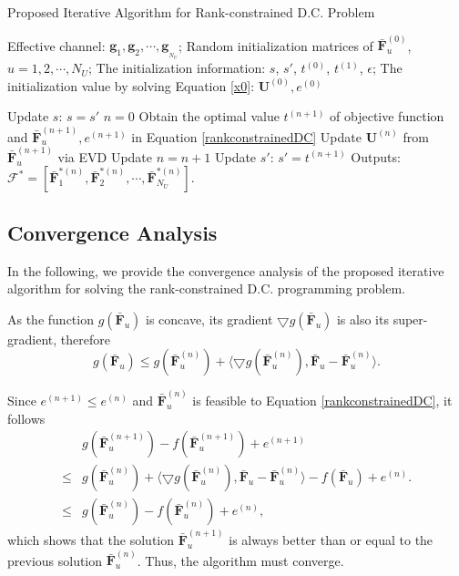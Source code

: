 \documentclass[10pt,journal,twocolumn,twoside]{IEEEtran}
\begin{document}
\begin{algorithm}[h] 		
	\caption{Proposed Iterative Algorithm for Rank-constrained D.C. Problem}
	\label{beam_cluster}
	\begin{algorithmic}
		\REQUIRE  \quad
		\STATE Effective channel: $\bm{g}_{1},\bm{g}_{2},\cdots,\bm{g}_{_{N_U}}$;
		\STATE Random initialization matrices of $\bar{\bm{F}}_u^{(0)}$, $u = 1,2,\cdots, N_U$;
		\STATE The initialization information: $s$, $s'$, $t^{(0)}$, $t^{(1)}$, $\epsilon$;
		\STATE The initialization value by solving Equation \eqref{x0}: $\bm{U}^{(0)}, e^{(0)}$
		\ENSURE
	\end{algorithmic}		
	\begin{algorithmic}[1]
		\STATE Update $s$: $s = s'$
		\STATE $n = 0$
       	\STATE Obtain the optimal value $t^{(n+1)}$ of objective function and $\bar{\bm{F}}^{(n+1)}_u, e^{(n+1)}$ in Equation \eqref{rankconstrainedDC}
       	\STATE Update $\bm{U}^{(n)}$ from $\bar{\bm{F}}^{(n+1)}_u$ via EVD
       	\STATE Update $n = n+1$
       	\ENDWHILE
		\ENDFOR
		\STATE Update $s'$: $s' = t^{(n+1)}$
		\ENDWHILE
		\STATE Outputs: $\bm{\mathcal{F}}^* =[\bar{\bm{F}}^{*(n)}_1, \bar{\bm{F}}^{*(n)}_2,\cdots, \bar{\bm{F}}^{*(n)}_{N_U}] $.
	\end{algorithmic}
\end{algorithm}


\subsection{Convergence Analysis} \label{convergence}
In the following, we provide the convergence analysis of the proposed iterative algorithm for solving the rank-constrained D.C. programming problem.

As the function $g(\bar{\bm{F}}_u)$ is concave, its gradient $\bigtriangledown g(\bar{\bm{F}}_u)$ is also its super-gradient, therefore
\begin{equation}
	g(\bar{\bm{F}}_u)\leq g(\bar{\bm{F}}^{(n)}_u) + \langle \bigtriangledown g(\bar{\bm{F}}^{(n)}_u), \bar{\bm{F}}_u -  \bar{\bm{F}}_u^{(n)} \rangle.
\end{equation}

Since $ e^{(n+1)} \leq e^{(n)}$ and $\bar{\bm{F}}_u^{(n)}$ is feasible to Equation \eqref{rankconstrainedDC}, it follows
\begin{align}
&g(\bar{\bm{F}}^{(n+1)}_u)  - f(\bar{\bm{F}}^{(n+1)}_u)  + e^{(n+1)} \\
\leq&g(\bar{\bm{F}}^{(n)}_u) + \langle \bigtriangledown g(\bar{\bm{F}}^{(n)}_u), \bar{\bm{F}}_u -  \bar{\bm{F}}_u^{(n)} \rangle - f(\bar{\bm{F}}_u) + e^{(n)}.\nonumber\\
\leq &g(\bar{\bm{F}}^{(n)}_u)  - f(\bar{\bm{F}}^{(n)}_u)  + e^{(n)}, \nonumber
\end{align}
which shows that the solution $\bar{\bm{F}}^{(n+1)}_u$ is always better than or equal to the previous solution $\bar{\bm{F}}^{(n)}_u$. Thus, the algorithm must converge.
\end{document}
